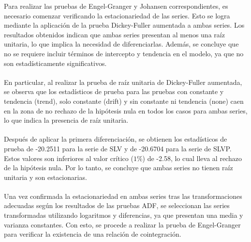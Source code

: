 \documentclass[11pt]{article}
\begin{document}
\begin{flushleft}
    Para realizar las pruebas de Engel-Granger y Johansen correspondientes, es necesario comenzar verificando la estacionariedad de las series. Esto se logra mediante la aplicación de la prueba Dickey-Fuller aumentada a ambas series. Los resultados obtenidos indican que ambas series presentan al menos una raíz unitaria, lo que implica la necesidad de diferenciarlas. Además, se concluye que no se requiere incluir términos de intercepto y tendencia en el modelo, ya que no son estadísticamente significativos.\\~\\
    En particular, al realizar la prueba de raíz unitaria de Dickey-Fuller aumentada, se observa que los estadísticos de prueba para las pruebas con constante y tendencia (trend), solo constante (drift) y sin constante ni tendencia (none) caen en la zona de no rechazo de la hipótesis nula en todos los casos para ambas series, lo que indica la presencia de raíz unitaria.\\~\\
    Después de aplicar la primera diferenciación, se obtienen los estadísticos de prueba de -20.2511 para la serie de SLV y de -20.6704 para la serie de SLVP. Estos valores son inferiores al valor crítico ($1\%$) de -2.58, lo cual lleva al rechazo de la hipótesis nula. Por lo tanto, se concluye que ambas series no tienen raíz unitaria y son estacionarias.\\~\\
    Una vez confirmada la estacionariedad en ambas series tras las transformaciones adecuadas según los resultados de las pruebas ADF, se seleccionan las series transformadas utilizando logaritmos y diferencias, ya que presentan una media y varianza constantes. Con esto, se procede a realizar la prueba de Engel-Granger para verificar la existencia de una relación de cointegración.
\end{flushleft}
\end{document}
